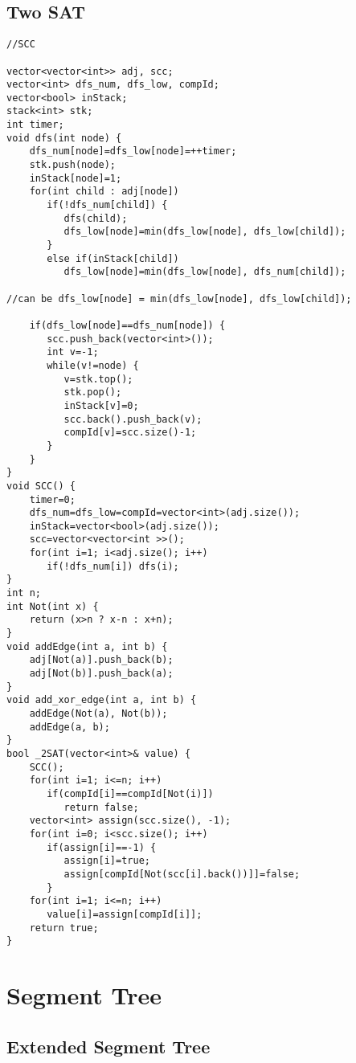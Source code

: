 \subsection{Two SAT}

\begin{lstlisting}[style=cpp]
 //SCC  
  
vector<vector<int>> adj, scc;  
vector<int> dfs_num, dfs_low, compId;  
vector<bool> inStack;  
stack<int> stk;  
int timer;  
void dfs(int node) {  
    dfs_num[node]=dfs_low[node]=++timer;  
    stk.push(node);  
    inStack[node]=1;  
    for(int child : adj[node])  
       if(!dfs_num[child]) {  
          dfs(child);  
          dfs_low[node]=min(dfs_low[node], dfs_low[child]);  
       }  
       else if(inStack[child])  
          dfs_low[node]=min(dfs_low[node], dfs_num[child]);  
  
//can be dfs_low[node] = min(dfs_low[node], dfs_low[child]);  
  
    if(dfs_low[node]==dfs_num[node]) {  
       scc.push_back(vector<int>());  
       int v=-1;  
       while(v!=node) {  
          v=stk.top();  
          stk.pop();  
          inStack[v]=0;  
          scc.back().push_back(v);  
          compId[v]=scc.size()-1;  
       }  
    }  
}  
void SCC() {  
    timer=0;  
    dfs_num=dfs_low=compId=vector<int>(adj.size());  
    inStack=vector<bool>(adj.size());  
    scc=vector<vector<int >>();  
    for(int i=1; i<adj.size(); i++)  
       if(!dfs_num[i]) dfs(i);  
}  
int n;  
int Not(int x) {  
    return (x>n ? x-n : x+n);  
}  
void addEdge(int a, int b) {  
    adj[Not(a)].push_back(b);  
    adj[Not(b)].push_back(a);  
}  
void add_xor_edge(int a, int b) {  
    addEdge(Not(a), Not(b));  
    addEdge(a, b);  
}  
bool _2SAT(vector<int>& value) {  
    SCC();  
    for(int i=1; i<=n; i++)  
       if(compId[i]==compId[Not(i)])  
          return false;  
    vector<int> assign(scc.size(), -1);  
    for(int i=0; i<scc.size(); i++)  
       if(assign[i]==-1) {  
          assign[i]=true;  
          assign[compId[Not(scc[i].back())]]=false;  
       }  
    for(int i=1; i<=n; i++)  
       value[i]=assign[compId[i]];  
    return true;  
}
\end{lstlisting}

\section{Segment Tree}

\subsection{Extended Segment Tree}

